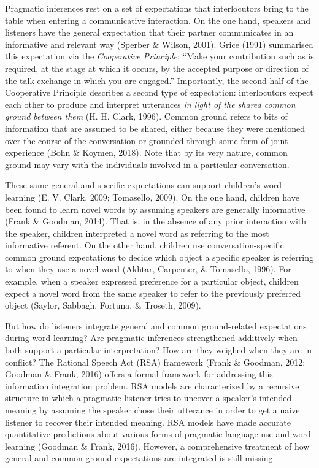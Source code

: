 \documentclass[10pt, letterpaper]{article}
\begin{document}
Pragmatic inferences rest on a set of expectations that interlocutors
bring to the table when entering a communicative interaction. On the one
hand, speakers and listeners have the general expectation that their
partner communicates in an informative and relevant way (Sperber \&
Wilson, 2001). Grice (1991) summarised this expectation via the
\emph{Cooperative Principle}: ``Make your contribution such as is
required, at the stage at which it occurs, by the accepted purpose or
direction of the talk exchange in which you are engaged.'' Importantly,
the second half of the Cooperative Principle describes a second type of
expectation: interlocutors expect each other to produce and interpret
utterances \emph{in light of the shared common ground between them} (H.
H. Clark, 1996). Common ground refers to bits of information that are
assumed to be shared, either because they were mentioned over the course
of the conversation or grounded through some form of joint experience
(Bohn \& Koymen, 2018). Note that by its very nature, common ground may
vary with the individuals involved in a particular conversation.

These same general and specific expectations can support children's word
learning (E. V. Clark, 2009; Tomasello, 2009). On the one hand, children
have been found to learn novel words by assuming speakers are generally
informative (Frank \& Goodman, 2014). That is, in the absence of any
prior interaction with the speaker, children interpreted a novel word as
referring to the most informative referent. On the other hand, children
use conversation-specific common ground expectations to decide which
object a specific speaker is referring to when they use a novel word
(Akhtar, Carpenter, \& Tomasello, 1996). For example, when a speaker
expressed preference for a particular object, children expect a novel
word from the same speaker to refer to the previously preferred object
(Saylor, Sabbagh, Fortuna, \& Troseth, 2009).

But how do listeners integrate general and common ground-related
expectations during word learning? Are pragmatic inferences strengthened
additively when both support a particular interpretation? How are they
weighed when they are in conflict? The Rational Speech Act (RSA)
framework (Frank \& Goodman, 2012; Goodman \& Frank, 2016) offers a
formal framework for addressing this information integration problem.
RSA models are characterized by a recursive structure in which a
pragmatic listener tries to uncover a speaker's intended meaning by
assuming the speaker chose their utterance in order to get a naive
listener to recover their intended meaning. RSA models have made
accurate quantitative predictions about various forms of pragmatic
language use and word learning (Goodman \& Frank, 2016). However, a
comprehensive treatment of how general and common ground expectations
are integrated is still missing.
\end{document}
